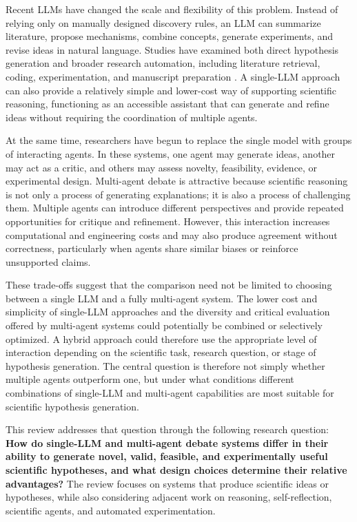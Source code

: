 \documentclass[11pt]{article}
\begin{document}
Recent LLMs have changed the scale and flexibility of this problem. Instead of relying only on manually designed discovery rules, an LLM can summarize literature, propose mechanisms, combine concepts, generate experiments, and revise ideas in natural language. Studies have examined both direct hypothesis generation \cite{zhou2024hypothesis,yang2024large} and broader research automation, including literature retrieval, coding, experimentation, and manuscript preparation \cite{lu2024ai,yamada2026towards}. A single-LLM approach can also provide a relatively simple and lower-cost way of supporting scientific reasoning, functioning as an accessible assistant that can generate and refine ideas without requiring the coordination of multiple agents.

At the same time, researchers have begun to replace the single model with groups of interacting agents. In these systems, one agent may generate ideas, another may act as a critic, and others may assess novelty, feasibility, evidence, or experimental design. Multi-agent debate is attractive because scientific reasoning is not only a process of generating explanations; it is also a process of challenging them. Multiple agents can introduce different perspectives and provide repeated opportunities for critique and refinement. However, this interaction increases computational and engineering costs and may also produce agreement without correctness, particularly when agents share similar biases or reinforce unsupported claims.

These trade-offs suggest that the comparison need not be limited to choosing between a single LLM and a fully multi-agent system. The lower cost and simplicity of single-LLM approaches and the diversity and critical evaluation offered by multi-agent systems could potentially be combined or selectively optimized. A hybrid approach could therefore use the appropriate level of interaction depending on the scientific task, research question, or stage of hypothesis generation. The central question is therefore not simply whether multiple agents outperform one, but under what conditions different combinations of single-LLM and multi-agent capabilities are most suitable for scientific hypothesis generation.

This review addresses that question through the following research question: \textbf{How do single-LLM and multi-agent debate systems differ in their ability to generate novel, valid, feasible, and experimentally useful scientific hypotheses, and what design choices determine their relative advantages?} The review focuses on systems that produce scientific ideas or hypotheses, while also considering adjacent work on reasoning, self-reflection, scientific agents, and automated experimentation.
\end{document}
